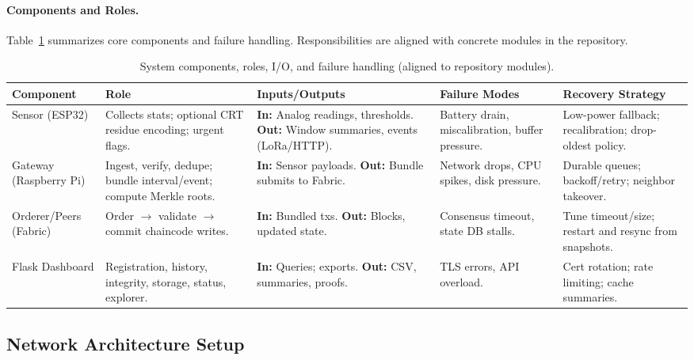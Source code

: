 \documentclass[12pt,onecolumn]{IEEEtran} %
\begin{document}
\paragraph{Components and Roles.}
Table~\ref{tab:components} summarizes core components and failure handling. Responsibilities are aligned with concrete modules in the repository.

\begin{table}[htbp]
  \centering
  \caption{System components, roles, I/O, and failure handling (aligned to repository modules).}
  \label{tab:components}
  \small
  \begin{tabularx}{\textwidth}{l>{\raggedright\arraybackslash}X>{\raggedright\arraybackslash}X>{\raggedright\arraybackslash}X>{\raggedright\arraybackslash}X}
    \toprule
    \textbf{Component} & \textbf{Role} & \textbf{Inputs/Outputs} & \textbf{Failure Modes} & \textbf{Recovery Strategy} \\
    \midrule
    Sensor (ESP32) & Collects stats; optional CRT residue encoding; urgent flags. & \textbf{In:} Analog readings, thresholds. \textbf{Out:} Window summaries, events (LoRa/HTTP). & Battery drain, miscalibration, buffer pressure. & Low-power fallback; recalibration; drop-oldest policy. \\
    \addlinespace
    Gateway (Raspberry Pi) & Ingest, verify, dedupe; bundle interval/event; compute Merkle roots. & \textbf{In:} Sensor payloads. \textbf{Out:} Bundle submits to Fabric. & Network drops, CPU spikes, disk pressure. & Durable queues; backoff/retry; neighbor takeover. \\
    \addlinespace
    Orderer/Peers (Fabric) & Order $\to$ validate $\to$ commit chaincode writes. & \textbf{In:} Bundled txs. \textbf{Out:} Blocks, updated state. & Consensus timeout, state DB stalls. & Tune timeout/size; restart and resync from snapshots. \\
    \addlinespace
    Flask Dashboard & Registration, history, integrity, storage, status, explorer. & \textbf{In:} Queries; exports. \textbf{Out:} CSV, summaries, proofs. & TLS errors, API overload. & Cert rotation; rate limiting; cache summaries. \\
    \bottomrule
  \end{tabularx}
\end{table}

\subsection{Network Architecture Setup}
\label{sec:results-network-setup}
\end{document}
